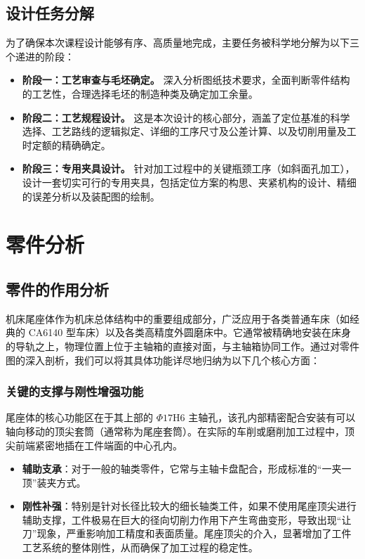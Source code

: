 \documentclass[withoutpreface,bwprint]{cumcmthesis}
\begin{document}
\subsection{设计任务分解}
为了确保本次课程设计能够有序、高质量地完成，主要任务被科学地分解为以下三个递进的阶段：
\begin{itemize}
    \item \textbf{阶段一：工艺审查与毛坯确定。} 深入分析图纸技术要求，全面判断零件结构的工艺性，合理选择毛坯的制造种类及确定加工余量。
    \item \textbf{阶段二：工艺规程设计。} 这是本次设计的核心部分，涵盖了定位基准的科学选择、工艺路线的逻辑拟定、详细的工序尺寸及公差计算、以及切削用量及工时定额的精确确定。
    \item \textbf{阶段三：专用夹具设计。} 针对加工过程中的关键瓶颈工序（如斜面孔加工），设计一套切实可行的专用夹具，包括定位方案的构思、夹紧机构的设计、精细的误差分析以及装配图的绘制。
\end{itemize}


\section{零件分析}

\subsection{零件的作用分析}
机床尾座体作为机床总体结构中的重要组成部分，广泛应用于各类普通车床（如经典的 CA6140 型车床）以及各类高精度外圆磨床中。它通常被精确地安装在床身的导轨之上，物理位置上位于主轴箱的直接对面，与主轴箱协同工作。通过对零件图的深入剖析，我们可以将其具体功能详尽地归纳为以下几个核心方面：

\subsubsection{关键的支撑与刚性增强功能}
尾座体的核心功能区在于其上部的 $\Phi17$H6 主轴孔，该孔内部精密配合安装有可以轴向移动的顶尖套筒（通常称为尾座套筒）。在实际的车削或磨削加工过程中，顶尖前端紧密地插在工件端面的中心孔内。
\begin{itemize}
    \item \textbf{辅助支承}：对于一般的轴类零件，它常与主轴卡盘配合，形成标准的“一夹一顶”装夹方式。
    \item \textbf{刚性补强}：特别是针对长径比较大的细长轴类工件，如果不使用尾座顶尖进行辅助支撑，工件极易在巨大的径向切削力作用下产生弯曲变形，导致出现“让刀”现象，严重影响加工精度和表面质量。尾座顶尖的介入，显著增加了工件工艺系统的整体刚性，从而确保了加工过程的稳定性。
\end{itemize}
\end{document}
